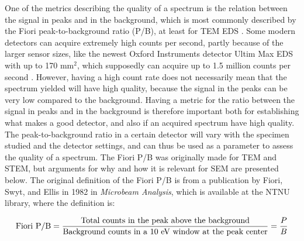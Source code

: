 One of the metrics describing the quality of a spectrum is the relation between the signal in peaks and in the background, which is most commonly described by the Fiori peak-to-background ratio (P/B), at least for TEM EDS \cite{williams_carter_tem_2009}.
Some modern detectors can acquire extremely high counts per second, partly because of the larger sensor sizes, like the newest Oxford Instruments detector Ultim Max EDS with up to 170 mm$^2$, which supposedly can acquire up to 1.5 million counts per second \cite{oxford_ultim_max}.
However, having a high count rate does not necessarily mean that the spectrum yielded will have high quality, because the signal in the peaks can be very low compared to the background.
Having a metric for the ratio between the signal in peaks and in the background is therefore important both for establishing what makes a good detector, and also if an acquired spectrum have high quality.
The peak-to-background ratio in a certain detector will vary with the specimen studied and the detector settings, and can thus be used as a parameter to assess the quality of a spectrum.
The Fiori P/B was originally made for TEM and STEM, but arguments for why and how it is relevant for SEM are presented below.
The original definition of the Fiori P/B is from a publication by Fiori, Swyt, and Ellis in 1982 \cite{fiori_peak_background_1982} in \emph{Microbeam Analysis}, which is available at the NTNU library, where the definition is:

\begin{equation}
    \label{eq:fiori_pb}
    \textnormal{Fiori P/B} = \frac{\textnormal{Total counts in the peak above the background}}{\textnormal{Background counts in a 10 eV window at the peak center}} = \frac{P}{B}
\end{equation}




